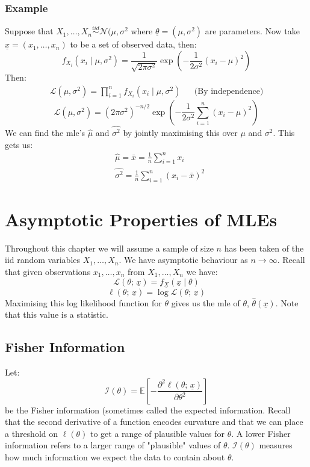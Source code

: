 \documentclass[12pt]{article}
\newcommand{\pf}[2]{\frac{\partial #1}{\partial #2}}
\newcommand{\iid}{\overset{iid}{\sim}}
\begin{document}
\subsubsection*{Example}
Suppose that \(X_1,\dots,X_n\iid\mathcal{N}(\mu,\sigma^2\) where \(\underline{\theta}=(\mu,\sigma^2)\) are parameters. Now take \(\underline{x}=(x_1,\dots,x_n)\) to be a set of observed data, then:
\[f_{X_i}(x_i\mid \mu,\sigma^2)=\frac{1}{\sqrt{2\pi\sigma^2}}\exp\left(-\frac{1}{2\sigma^2}(x_i-\mu)^2\right)\]
Then:
\begin{align*}
  \mathcal{L}(\mu,\sigma^2)=\prod^n_{i=1}f_{X_i}(x_i\mid\mu,\sigma^2)&&\text{(By independence)}  
\end{align*}
\[\mathcal{L}(\mu,\sigma^2)=(2\pi\sigma^2)^{-n/2}\exp\left(-\frac{1}{2\sigma^2}\sum^n_{i=1}(x_i-\mu)^2\right)\]
We can find the mle's \(\hat{\mu}\) and \(\hat{\sigma^2}\) by jointly maximising this over \(\mu\) and \(\sigma^2\). This gets us:
\begin{align*}
    &\hat{\mu}=\bar{x}=\frac{1}{n}\sum^n_{i=1}x_i \\
    &\hat{\sigma^2}=\frac{1}{n}\sum^n_{i=1}(x_i-\bar{x})^2
\end{align*}
\clearpage
\section{Asymptotic Properties of MLEs}
Throughout this chapter we will assume a sample of size \(n\) has been taken of the iid random variables \(X_1,\dots,X_n\). We have asymptotic behaviour as \(n\to\infty\). Recall that given observations \(x_1,\dots,x_n\) from \(X_1,\dots,X_n\) we have:
\[\mathcal{L}(\theta;\, \underline{x})=f_{\underline{X}}(\underline{x}\mid \theta)\]
\[\ell(\theta;\, \underline{x})=\log\mathcal{L}(\theta;\, \underline{x})\]
Maximising this log likelihood function for \(\theta\) gives us the mle of \(\theta\), \(\hat{\theta}(\underline{x})\). Note that this value is a statistic.
\subsection{Fisher Information}
Let:
\[\mathcal{I}(\theta)=\mathbb{E}\left[-\pf{^2\ell(\theta;\,\underline{x})}{\theta^2}\right]\]
be the Fisher information (sometimes called the expected information. Recall that the second derivative of a function encodes curvature and that we can place a threshold on \(\ell(\theta)\) to get a range of plausible values for \(\theta\). A lower Fisher information refers to a larger range of "plausible" values of \(\theta\). \(\mathcal{I}(\theta)\) measures how much information we expect the data to contain about \(\theta\).
\end{document}
